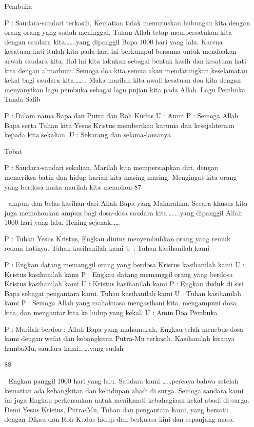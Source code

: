 Pembuka 

P 
: Saudara-saudari terkasih, 
Kematian tidak memutuskan hubungan kita dengan 
orang-orang yang sudah meninggal. Tuhan Allah tetap 
mempersatukan kita dengan saudara kita…….yang 
dipanggil Bapa 1000 hari yang lalu. Karena kesatuan hati 
itulah kita pada hari ini berkumpul bersama untuk 
mendoakan arwah saudara kita. Hal ini kita lakukan 
sebagai bentuk kasih dan kesatuan hati kita dengan 
almarhum. Semoga doa kita semua akan mendatangkan 
keselamatan kekal bagi saudara kita…….. Maka marilah 
kita awali kesatuan doa kita dengan menyanyikan lagu 
pembuka sebagai lagu pujian kita pada Allah. 
Lagu Pembuka 
Tanda Salib 

P : Dalam nama Bapa dan Putra dan Roh Kudus 
U : Amin 
P : Semoga Allah Bapa serta Tuhan kita Yesus Kristus 
memberikan karunia dan kesejahteraan kepada kita 
sekalian. 
U : Sekarang dan selama-lamanya 

Tobat 

P 
: Saudara-saudari sekalian, 
Marilah kita mempersiapkan diri, dengan memeriksa 
batin dan hidup harian kita masing-masing. Mengingat 
kita orang yang berdosa maka marilah kita memohon 
87 



ampun dan belas kasihan dari Allah Bapa yang 
Maharahim. Secara khusus kita juga memohonkan ampun 
bagi dosa-dosa saudara kita……..yang dipanggil Allah 
1000 hari yang lalu. 
Hening sejenak…… 

P : Tuhan Yesus Kristus, Engkau diutus menyembuhkan 
orang yang remuk redam hatinya. 
Tuhan kasihanilah kami 
U : Tuhan kasihanilah kami 

P 
: Engkau datang memanggil orang yang berdosa 
Kristus kasihanilah kami 
U : Kristus kasihanilah kami 
P 
: Engkau datang memanggil orang yang berdosa 
Kristus kasihanilah kami 
U : Kristus kasihanilah kami 
P 
: Engkau duduk di sisi Bapa sebagai pengantara kami. 
Tuhan kasihanilah kami 
U : Tuhan kasihanilah kami 
P 
: Semoga Allah yang mahakuasa mengasihani kita, 
mengampuni dosa kita, dan mengantar kita ke hidup yang 
kekal. 
U : Amin 
Doa Pembuka 

P : Marilah berdoa : 
Allah Bapa yang mahamurah, Engkau telah menebus dosa 
kami dengan wafat dan kebangkitan Putra-Mu terkasih. 
Kasihanilah kiranya hambaMu, saudara kami…….yang sudah 

88 



Engkau panggil 1000 hari yang lalu. Saudara kami ……percaya 
bahwa setelah kematian ada kebangkitan dan kehidupan abadi 
di surga. Semoga saudara kami ini juga Engkau perkenankan 
untuk menikmati kebahagiaan kekal abadi di surga. Demi 
Yesus Kristus, Putra-Mu, Tuhan dan pengantara kami, yang 
bersatu dengan Dikau dan Roh Kudus hidup dan berkuasa kini 
dan sepanjang masa. 

